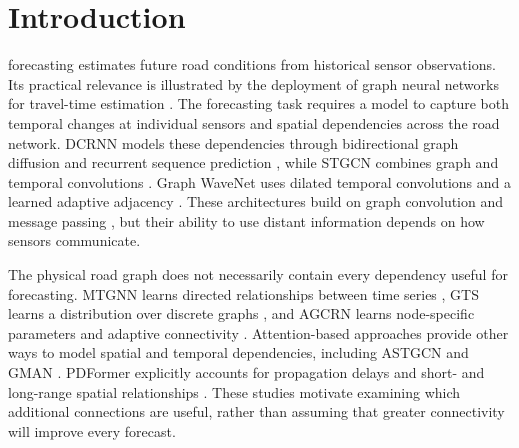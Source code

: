 \section{Introduction}\label{sec:introduction}

 forecasting estimates future road conditions from historical sensor observations. Its practical relevance is illustrated by the deployment of graph neural networks for travel-time estimation \cite{derrowpinion2021eta}. The forecasting task requires a model to capture both temporal changes at individual sensors and spatial dependencies across the road network. DCRNN models these dependencies through bidirectional graph diffusion and recurrent sequence prediction \cite{li2018dcrnn}, while STGCN combines graph and temporal convolutions \cite{yu2018stgcn}. Graph WaveNet uses dilated temporal convolutions and a learned adaptive adjacency \cite{wu2019graphwavenet}. These architectures build on graph convolution and message passing \cite{kipf2017gcn,gilmer2017mpnn}, but their ability to use distant information depends on how sensors communicate.

The physical road graph does not necessarily contain every dependency useful for forecasting. MTGNN learns directed relationships between time series \cite{wu2020mtgnn}, GTS learns a distribution over discrete graphs \cite{shang2021gts}, and AGCRN learns node-specific parameters and adaptive connectivity \cite{bai2020agcrn}. Attention-based approaches provide other ways to model spatial and temporal dependencies, including ASTGCN and GMAN \cite{guo2019astgcn,zheng2020gman}. PDFormer explicitly accounts for propagation delays and short- and long-range spatial relationships \cite{jiang2023pdformer}. These studies motivate examining which additional connections are useful, rather than assuming that greater connectivity will improve every forecast.

